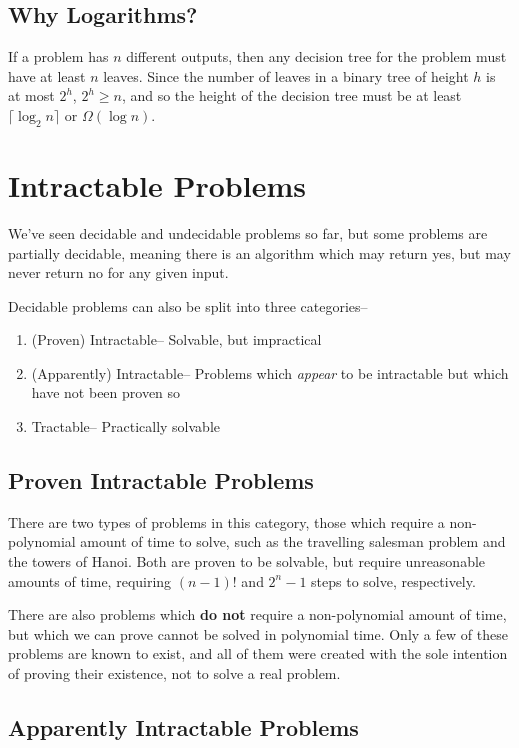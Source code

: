 \subsection*{Why Logarithms?}

If a problem has $n$ different outputs, then any decision tree for the problem must have at least $n$ leaves. Since the
 number of leaves in a binary tree of height $h$ is at most $2^h$, $2^h \geq n$, and so the height of the decision tree
 must be at least $\lceil \log_{2}{n} \rceil$ or $\Omega(\log n)$.

\section*{Intractable Problems}

We've seen decidable and undecidable problems so far, but some problems are partially decidable, meaning there is an
 algorithm which may return yes, but may never return no for any given input.

Decidable problems can also be split into three categories--
\begin{enumerate}
  \item (Proven) Intractable-- Solvable, but impractical
  \item (Apparently) Intractable-- Problems which \textit{appear} to be intractable but which have not been proven so
  \item Tractable-- Practically solvable
\end{enumerate}

\subsection*{Proven Intractable Problems}

There are two types of problems in this category, those which require a non-polynomial amount of time to solve, such
 as the travelling salesman problem and the towers of Hanoi. Both are proven to be solvable, but require unreasonable
 amounts of time, requiring ${(n - 1)!}$ and $2^n - 1$ steps to solve, respectively.

There are also problems which \textbf{do not} require a non-polynomial amount of time, but which we can prove cannot
 be solved in polynomial time. Only a few of these problems are known to exist, and all of them were created with the
 sole intention of proving their existence, not to solve a real problem.

\subsection*{Apparently Intractable Problems}

